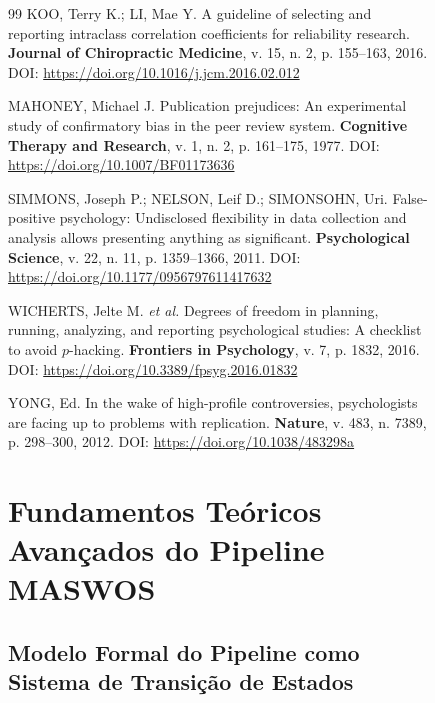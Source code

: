 \begin{figure}
\begin{thebibliography}{99}
KOO, Terry K.; LI, Mae Y.
A guideline of selecting and reporting intraclass correlation
coefficients for reliability research.
\textbf{Journal of Chiropractic Medicine}, v. 15, n. 2,
p. 155--163, 2016.
DOI: \url{https://doi.org/10.1016/j.jcm.2016.02.012}

MAHONEY, Michael J.
Publication prejudices: An experimental study of confirmatory bias
in the peer review system.
\textbf{Cognitive Therapy and Research}, v. 1, n. 2,
p. 161--175, 1977.
DOI: \url{https://doi.org/10.1007/BF01173636}

SIMMONS, Joseph P.; NELSON, Leif D.; SIMONSOHN, Uri.
False-positive psychology: Undisclosed flexibility in data
collection and analysis allows presenting anything as significant.
\textbf{Psychological Science}, v. 22, n. 11, p. 1359--1366,
2011.
DOI: \url{https://doi.org/10.1177/0956797611417632}

WICHERTS, Jelte M. \textit{et al.}
Degrees of freedom in planning, running, analyzing, and reporting
psychological studies: A checklist to avoid \(p\)-hacking.
\textbf{Frontiers in Psychology}, v. 7, p. 1832, 2016.
DOI: \url{https://doi.org/10.3389/fpsyg.2016.01832}

YONG, Ed.
In the wake of high-profile controversies, psychologists are
facing up to problems with replication.
\textbf{Nature}, v. 483, n. 7389, p. 298--300, 2012.
DOI: \url{https://doi.org/10.1038/483298a}

\end{thebibliography}




\section{Fundamentos Teóricos Avançados do Pipeline MASWOS}
\label{sec:fundamentos_avancados}

\subsection{Modelo Formal do Pipeline como Sistema de Transição de Estados}
\label{sec:modelo_formal}


\end{figure}
